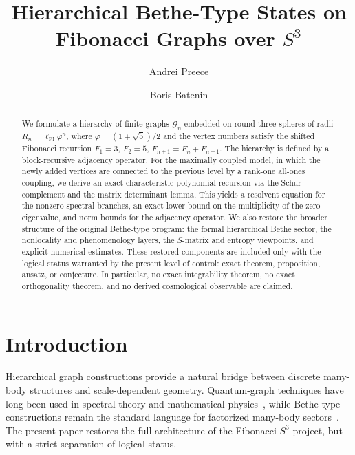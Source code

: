 \documentclass[
  aps,
  prd,
  reprint,
  superscriptaddress,
  nofootinbib,
  longbibliography,
  amsmath,
  amssymb
]{revtex4-2}
\theoremstyle{remark}
\newcommand{\Sthree}{S^{3}}
\newcommand{\lPl}{\ell_{\mathrm{Pl}}}
\newcommand{\phig}{\varphi}
\newcommand{\Gn}{\mathcal{G}_{n}}
\begin{document}
\title{Hierarchical Bethe-Type States on Fibonacci Graphs over \texorpdfstring{$S^3$}{S3}}

\author{Andrei Preece}

\author{Boris Batenin}

\begin{abstract}
We formulate a hierarchy of finite graphs $\Gn$ embedded on round three-spheres of radii $R_n=\lPl\phig^n$, where $\phig=(1+\sqrt5)/2$ and the vertex numbers satisfy the shifted Fibonacci recursion $F_1=3$, $F_2=5$, $F_{n+1}=F_n+F_{n-1}$. The hierarchy is defined by a block-recursive adjacency operator. For the maximally coupled model, in which the newly added vertices are connected to the previous level by a rank-one all-ones coupling, we derive an exact characteristic-polynomial recursion via the Schur complement and the matrix determinant lemma. This yields a resolvent equation for the nonzero spectral branches, an exact lower bound on the multiplicity of the zero eigenvalue, and norm bounds for the adjacency operator. We also restore the broader structure of the original Bethe-type program: the formal hierarchical Bethe sector, the nonlocality and phenomenology layers, the $S$-matrix and entropy viewpoints, and explicit numerical estimates. These restored components are included only with the logical status warranted by the present level of control: exact theorem, proposition, ansatz, or conjecture. In particular, no exact integrability theorem, no exact orthogonality theorem, and no derived cosmological observable are claimed.
\end{abstract}

\maketitle

\section{Introduction}
\label{sec:intro}

Hierarchical graph constructions provide a natural bridge between discrete many-body structures and scale-dependent geometry. Quantum-graph techniques have long been used in spectral theory and mathematical physics~\cite{Berkolaiko2013}, while Bethe-type constructions remain the standard language for factorized many-body sectors~\cite{Bethe1931}. The present paper restores the full architecture of the Fibonacci-$\Sthree$ project, but with a strict separation of logical status.
\end{document}
